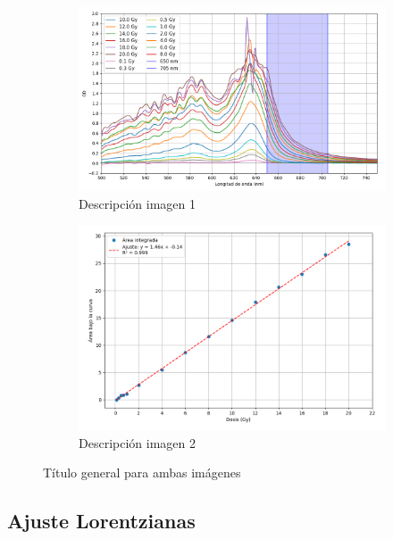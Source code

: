 \documentclass[onecolumn,12pt]{article} %
\begin{document}
\begin{figure}[H]
    \centering
    \begin{subfigure}[b]{0.45\textwidth}
        \centering
        \includegraphics[width=\textwidth]{img_Esp/Integral.png}
        \caption{Descripción imagen 1}
        \label{fig:img1}
    \end{subfigure}
    \hfill
    \begin{subfigure}[b]{0.5\textwidth}
        \centering
        \includegraphics[width=\textwidth]{img_Esp/IntegralCali.png}
        \caption{Descripción imagen 2}
        \label{fig:img2}
    \end{subfigure}
    \caption{Título general para ambas imágenes}
    \label{fig:ambas}
\end{figure}


\subsection{Ajuste Lorentzianas}
\end{document}
